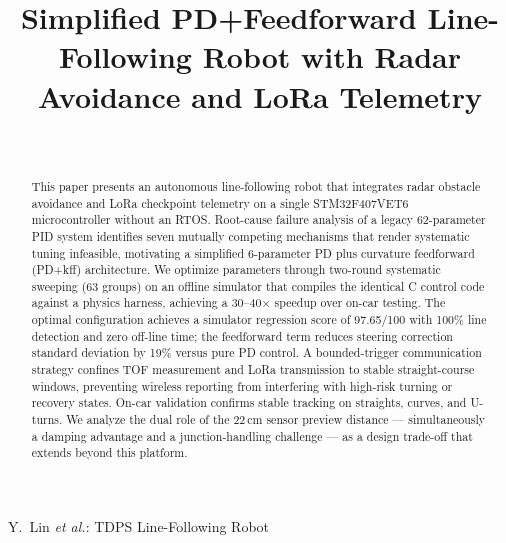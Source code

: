 \documentclass[letterpaper,journal]{IEEEtran}
\begin{document}
\title{Simplified PD+Feedforward Line-Following Robot with Radar Avoidance and LoRa Telemetry}

\author{
     \\

}

%
{Y.~Lin \textit{et al.}: TDPS Line-Following Robot}

\maketitle

\begin{abstract}
This paper presents an autonomous line-following robot that integrates radar obstacle avoidance and LoRa checkpoint telemetry on a single STM32F407VET6 microcontroller without an RTOS. Root-cause failure analysis of a legacy 62-parameter PID system identifies seven mutually competing mechanisms that render systematic tuning infeasible, motivating a simplified 6-parameter PD plus curvature feedforward (PD+kff) architecture. We optimize parameters through two-round systematic sweeping (63 groups) on an offline simulator that compiles the identical C control code against a physics harness, achieving a 30--40$\times$ speedup over on-car testing. The optimal configuration achieves a simulator regression score of 97.65/100 with 100\% line detection and zero off-line time; the feedforward term reduces steering correction standard deviation by 19\% versus pure PD control. A bounded-trigger communication strategy confines TOF measurement and LoRa transmission to stable straight-course windows, preventing wireless reporting from interfering with high-risk turning or recovery states. On-car validation confirms stable tracking on straights, curves, and U-turns. We analyze the dual role of the 22\,cm sensor preview distance --- simultaneously a damping advantage and a junction-handling challenge --- as a design trade-off that extends beyond this platform.
\end{abstract}
\end{document}

